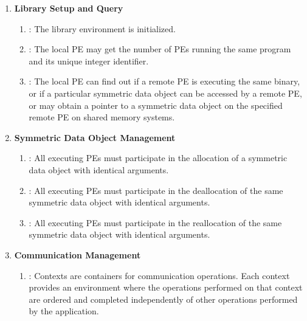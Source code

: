 \begin{enumerate}

\item \textbf{Library Setup and Query}
\begin{enumerate}
  \item {}: The \openshmem 
  library environment is initialized. 
  \item {}:  The local \ac{PE} may get the 
  number of \acp{PE} running
      the same program and its unique integer identifier. 
  \item {}:  The local \ac{PE} 
  can find out if a remote 
      \ac{PE} is executing the same binary, or if a particular symmetric data object can be
      accessed by a remote \ac{PE}, or may obtain a pointer to a symmetric data
      object on the specified remote \ac{PE} on shared memory systems.
\end{enumerate}

\item \textbf{Symmetric Data Object Management}
\begin{enumerate}
  \item {}:  All executing \acp{PE} 
  must participate in the allocation of a symmetric data object with identical arguments.
  \item  {}:  All executing 
  \acp{PE} must participate in the deallocation of the same symmetric data object with identical arguments.
  \item  {}:  All executing \acp{PE} 
  must participate in the reallocation of the same symmetric data object with identical arguments.
\end{enumerate}

\item \textbf{Communication Management}
\begin{enumerate}
    \item {}:  Contexts are 
    	containers for communication operations. Each context provides an environment 
	where the operations performed on that context are ordered and completed 
	independently of other operations performed by the application.
\end{enumerate}


\end{enumerate}

